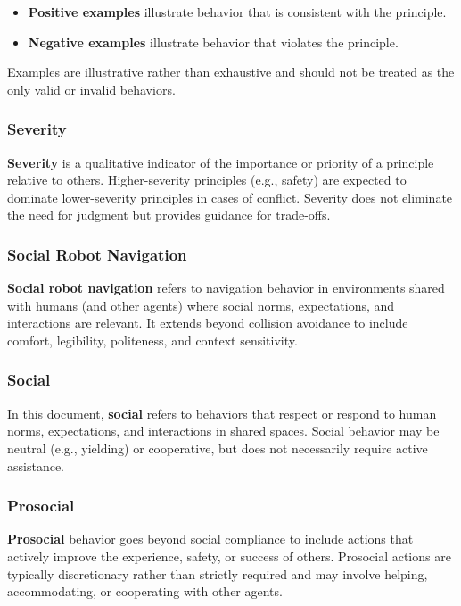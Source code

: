\documentclass[utf8]{frontiers_suppmat} %
\providecommand{\tightlist}{%
  \setlength{\itemsep}{0pt}\setlength{\parskip}{0pt}}
\begin{document}
\begin{itemize}
\tightlist
\item
  \textbf{Positive examples} illustrate behavior that is consistent with
  the principle.
\item
  \textbf{Negative examples} illustrate behavior that violates the
  principle.
\end{itemize}

Examples are illustrative rather than exhaustive and should not be
treated as the only valid or invalid behaviors.

\subsubsection{Severity}\label{severity}

\textbf{Severity} is a qualitative indicator of the importance or
priority of a principle relative to others. Higher-severity principles
(e.g., safety) are expected to dominate lower-severity principles in
cases of conflict. Severity does not eliminate the need for judgment but
provides guidance for trade-offs.

\subsubsection{Social Robot Navigation}\label{social-robot-navigation}

\textbf{Social robot navigation} refers to navigation behavior in
environments shared with humans (and other agents) where social norms,
expectations, and interactions are relevant. It extends beyond collision
avoidance to include comfort, legibility, politeness, and context
sensitivity.

\subsubsection{Social}\label{social}

In this document, \textbf{social} refers to behaviors that respect or
respond to human norms, expectations, and interactions in shared spaces.
Social behavior may be neutral (e.g., yielding) or cooperative, but does
not necessarily require active assistance.

\subsubsection{Prosocial}\label{prosocial}

\textbf{Prosocial} behavior goes beyond social compliance to include
actions that actively improve the experience, safety, or success of
others. Prosocial actions are typically discretionary rather than
strictly required and may involve helping, accommodating, or cooperating
with other agents.
\end{document}
